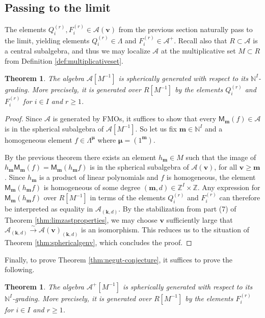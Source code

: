 \documentclass[11pt,reqno]{amsart}
\renewcommand{\mathbf}{\mathbold}
\numberwithin{equation}{section}
\newtheorem{Theorem}[equation]{Theorem}
\theoremstyle{definition}
\newcommand{\cA}{\mathcal{A}}
\newcommand{\bk}{\mathbf{k}}
\newcommand{\bm}{\mathbf{m}}
\newcommand{\bv}{\mathbf{v}}
\newcommand{\NN}{\mathbb{N}}
\newcommand{\ZZ}{\mathbb{Z}}
\renewcommand{\bv}{\mathbf{v}} %
\newcommand{\M}{\mathsf{M}}
\newcommand{\vertexset}{I}
\newcommand{\GT}{\Lambda}
\newcommand{\base}{R}
\newcommand{\bmu}{{\boldsymbol{\mu}}}
\newcommand{\qzast}{\cA}
\newcommand{\qzastplus}{\cA^{+}}
\begin{document}
\subsection{Passing to the limit}
The elements $Q_i^{(r)}, F_i^{(r)} \in \qzast(\bv)$ from the previous section naturally pass to the limit, yielding elements $Q_i^{(r)} \in \GT$ and $F_i^{(r)} \in \qzastplus$.  Recall also that $\base \subset \qzast$ is a central subalgebra, and thus we may localize $\qzast$ at the multiplicative set $M\subset \base$ from Definition \ref{def:multiplicativeset}.
\begin{Theorem}
    \label{thm:sphericalgen}
    The algebra $\qzast[M^{-1}]$  is spherically generated with respect to its $\NN^\vertexset$-grading. More precisely, it is generated over $\base[M^{-1}]$ by the elements $Q_i^{(r)}$ and $F_i^{(r)}$ for $i \in \vertexset$ and $r\geq 1$.
\end{Theorem}
\begin{proof}
    Since $\qzast$ is generated by FMOs, it suffices  to show that every $\M_\bm(f) \in \qzast$ is in the spherical subalgebra of $\qzast[M^{-1}]$.  So let us fix $\bm \in \NN^\vertexset$ and a homogeneous element $f \in \GT^\bmu$ where $\bmu = (1^\bm)$.  
    
    By the previous theorem there exists an element $h_\bm \in M$ such that the image of $h_\bm\M_\bm(f) =\M_\bm(h_\bm f)$ is in the spherical subalgebra of  $\qzast(\bv)$, for all $\bv \geq \bm$. Since $h_\bm$ is a product of linear polynomials and $f$ is homogeneous,  the element $\M_\bm(h_\bm f)$ is homogeneous of some degree $(\bm, d) \in \ZZ^\vertexset\times \ZZ$. Any expression for $\M_\bm(h_\bm f)$ over $\base[M^{-1}]$ in terms of the elements $Q_i^{(r)}$ and $F_i^{(r)}$ can therefore be interpreted as equality in $\qzast_{(\bk, d)}$.
    By the stabilization from part (7) of Theorem \ref{thm:limzastproperties}, we may choose $\bv$ sufficiently large that $\qzast_{(\bk, d)} \xrightarrow{\sim} \qzast(\bv)_{(\bk, d)}$ is an isomorphism.  This reduces us to the situation of Theorem \ref{thm:sphericalgenv}, which concludes the proof.

    
    

\end{proof}

Finally, to prove Theorem \ref{thm:negut-conjecture}, it suffices to prove the following.

\begin{Theorem}
The algebra $\qzastplus[M^{-1}]$ is spherically generated with respect to its $\NN^\vertexset$-grading.  More precisely, it is generated over $\base[M^{-1}]$ by the  elements  $F_i^{(r)}$ for $i \in \vertexset$ and $r \geq 1$.
\end{Theorem}
\end{document}
